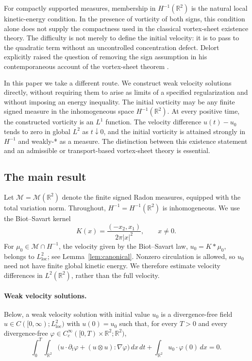 \documentclass[11pt,a4paper,reqno]{amsart}
\theoremstyle{plain}
\theoremstyle{definition}
\theoremstyle{remark}
\numberwithin{equation}{section}
\newcommand{\R}{\mathbb R}
\newcommand{\M}{\mathcal M}
\newcommand{\dd}{\,dx}
\begin{document}
For compactly supported measures, membership in $H^{-1}(\R^2)$ is the
natural local kinetic-energy condition. In the presence of vorticity of
both signs, this condition alone does not supply the compactness used
in the classical vortex-sheet existence theory. The difficulty is not
merely to define the initial velocity: it is to pass to the quadratic
term without an uncontrolled concentration defect. Delort explicitly
raised the question of removing the sign assumption in his
contemporaneous account of the vortex-sheet theorem
\cite[\S4, pp.~II--10--II--11]{DelortSem}.

In this paper we take a different route. We construct weak velocity
solutions directly, without requiring them to arise as limits of a
specified regularization and without imposing an energy inequality.
The initial vorticity may be any finite signed measure in the
inhomogeneous space $H^{-1}(\R^2)$. At every positive time, the
constructed vorticity is an $L^1$ function. The velocity difference $u(t)-u_0$ tends to zero in global $L^2$
as $t\downarrow0$, and the initial vorticity is attained strongly in
$H^{-1}$ and weakly-* as a measure.
The distinction between this existence statement and an admissible or
transport-based vortex-sheet theory is essential.

\subsection{The main result}

Let $\M=\M(\R^2)$ denote the finite signed Radon measures, equipped
with the total variation norm. Throughout, $H^{-1}=H^{-1}(\R^2)$ is
inhomogeneous. We use the Biot--Savart kernel
\[
 K(x)=\frac{(-x_2,x_1)}{2\pi|x|^2},\qquad x\ne0.
\]
For $\mu_0\in\M\cap H^{-1}$, the velocity given by the
Biot--Savart law, $u_0=K*\mu_0$, belongs to $L^2_{\mathrm{loc}}$;
see Lemma~\ref{lem:canonical}. Nonzero circulation is allowed, so
$u_0$ need not have finite global kinetic energy. We therefore
estimate velocity differences in $L^2(\R^2)$, rather than the full
velocity.

\paragraph{Weak velocity solutions.}
Below, a weak velocity solution with initial value $u_0$ is a
divergence-free field $u\in C([0,\infty);L^2_{\mathrm{loc}})$ with
$u(0)=u_0$ such that, for every $T>0$ and every divergence-free
$\varphi\in C_c^\infty([0,T)\times\R^2;\R^2)$,
\begin{equation}\label{eq:weak-euler}
 \int_0^T\!\int_{\R^2}
 \bigl(u\cdot\partial_t\varphi+(u\otimes u):\nabla\varphi\bigr)
 \dd\,dt+\int_{\R^2}u_0\cdot\varphi(0)\dd=0.
\end{equation}
\end{document}
